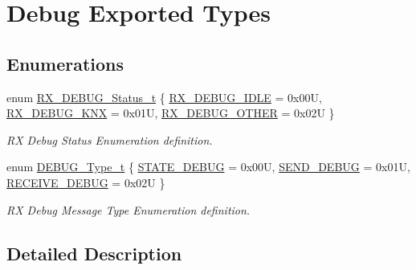 \hypertarget{group___debug___exported___types}{}\section{Debug Exported Types}
\label{group___debug___exported___types}
\subsection*{Enumerations}
\begin{DoxyCompactItemize}
\item 
enum \hyperlink{group___debug___exported___types_gabcec3ea567663bbefa0b9f7a88dd68f2}{R\+X\+\_\+\+D\+E\+B\+U\+G\+\_\+\+Status\+\_\+t} \{ \hyperlink{group___debug___exported___types_ggabcec3ea567663bbefa0b9f7a88dd68f2a9be7a7b6137e4337233fdc0a02e4d20c}{R\+X\+\_\+\+D\+E\+B\+U\+G\+\_\+\+I\+D\+LE} = 0x00U, 
\hyperlink{group___debug___exported___types_ggabcec3ea567663bbefa0b9f7a88dd68f2a601e7df15abbf2a8de94418b74ea57fb}{R\+X\+\_\+\+D\+E\+B\+U\+G\+\_\+\+K\+NX} = 0x01U, 
\hyperlink{group___debug___exported___types_ggabcec3ea567663bbefa0b9f7a88dd68f2ad6618747bfa92556e5fc0f50df497771}{R\+X\+\_\+\+D\+E\+B\+U\+G\+\_\+\+O\+T\+H\+ER} = 0x02U
 \}\begin{DoxyCompactList}\small\item\em RX Debug Status Enumeration definition. \end{DoxyCompactList}
\item 
enum \hyperlink{group___debug___exported___types_gacb1775677105967978fae4d9155cca26}{D\+E\+B\+U\+G\+\_\+\+Type\+\_\+t} \{ \hyperlink{group___debug___exported___types_ggacb1775677105967978fae4d9155cca26a0cad8d390f2e4ac93049277fd291a95e}{S\+T\+A\+T\+E\+\_\+\+D\+E\+B\+UG} = 0x00U, 
\hyperlink{group___debug___exported___types_ggacb1775677105967978fae4d9155cca26aa8996ee795e2d49fb83539a0ac88342e}{S\+E\+N\+D\+\_\+\+D\+E\+B\+UG} = 0x01U, 
\hyperlink{group___debug___exported___types_ggacb1775677105967978fae4d9155cca26a6ae1781bce3c10f579294c10c005648b}{R\+E\+C\+E\+I\+V\+E\+\_\+\+D\+E\+B\+UG} = 0x02U
 \}\begin{DoxyCompactList}\small\item\em RX Debug Message Type Enumeration definition. \end{DoxyCompactList}
\end{DoxyCompactItemize}


\subsection{Detailed Description}


